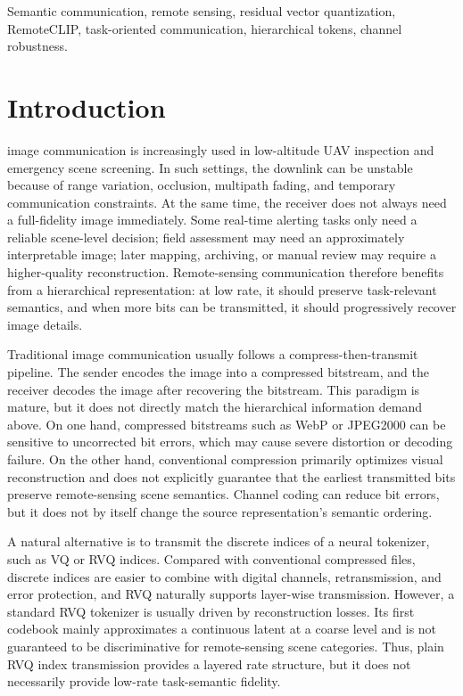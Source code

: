 \documentclass[lettersize,journal]{IEEEtran}
\begin{document}
\begin{IEEEkeywords}
Semantic communication, remote sensing, residual vector quantization, RemoteCLIP, task-oriented communication, hierarchical tokens, channel robustness.
\end{IEEEkeywords}

\section{Introduction}
 image communication is increasingly used in low-altitude UAV inspection and emergency scene screening. In such settings, the downlink can be unstable because of range variation, occlusion, multipath fading, and temporary communication constraints. At the same time, the receiver does not always need a full-fidelity image immediately. Some real-time alerting tasks only need a reliable scene-level decision; field assessment may need an approximately interpretable image; later mapping, archiving, or manual review may require a higher-quality reconstruction. Remote-sensing communication therefore benefits from a hierarchical representation: at low rate, it should preserve task-relevant semantics, and when more bits can be transmitted, it should progressively recover image details.

Traditional image communication usually follows a compress-then-transmit pipeline. The sender encodes the image into a compressed bitstream, and the receiver decodes the image after recovering the bitstream. This paradigm is mature, but it does not directly match the hierarchical information demand above. On one hand, compressed bitstreams such as WebP or JPEG2000 can be sensitive to uncorrected bit errors, which may cause severe distortion or decoding failure. On the other hand, conventional compression primarily optimizes visual reconstruction and does not explicitly guarantee that the earliest transmitted bits preserve remote-sensing scene semantics. Channel coding can reduce bit errors, but it does not by itself change the source representation's semantic ordering.

A natural alternative is to transmit the discrete indices of a neural tokenizer, such as VQ or RVQ indices. Compared with conventional compressed files, discrete indices are easier to combine with digital channels, retransmission, and error protection, and RVQ naturally supports layer-wise transmission. However, a standard RVQ tokenizer is usually driven by reconstruction losses. Its first codebook mainly approximates a continuous latent at a coarse level and is not guaranteed to be discriminative for remote-sensing scene categories. Thus, plain RVQ index transmission provides a layered rate structure, but it does not necessarily provide low-rate task-semantic fidelity.
\end{document}
